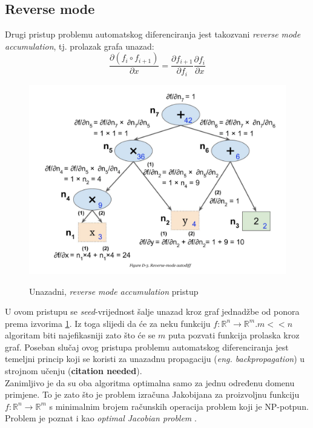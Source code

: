 \documentclass[zavrsnirad]{fer}
\begin{document}
\subsection{Reverse mode}
Drugi pristup problemu automatskog diferenciranja jest takozvani \textit{reverse mode accumulation}, tj. prolazak grafa unazad:
\begin{equation}
  \frac{\partial (f_i \circ f_{i+1})}{\partial x} = \frac{\partial f_{i+1}}{\partial f_i} \frac{\partial f_i}{\partial x}
\end{equation}
\begin{figure}[h]
  \centering
  \includegraphics[width=0.7\linewidth]{"./slike/reverse_graph.png"}
  \caption{Unazadni, \textit{reverse mode accumulation} pristup}
  \cite{srijithr_gitlab}
  \label{slk:reverse_graf}
\end{figure}
U ovom pristupu se \textit{seed}-vrijednost šalje unazad kroz graf jednadžbe od ponora prema izvorima \ref{slk:reverse_graf}. Iz toga slijedi da će za neku funkciju $f\colon \mathbb{R}^n \rightarrow \mathbb{R}^m. m << n$ algoritam biti najefikasniji zato što će se $m$ puta pozvati funkcija prolaska kroz graf. Poseban slučaj ovog pristupa problemu automatskog diferenciranja jest temeljni princip koji se koristi za unazadnu propagaciju (\textit{eng. backpropagation}) u strojnom učenju (\textbf{citation needed}).
\\
Zanimljivo je da su oba algoritma optimalna samo za jednu određenu domenu primjene. To je zato što je problem izračuna Jakobijana za proizvoljnu funkciju $f\colon \mathbb{R}^n \rightarrow \mathbb{R}^m$ s minimalnim brojem računskih operacija problem koji je NP-potpun. Problem je poznat i kao \textit{optimal Jacobian problem} \cite{naumann:optimaljacobian}.
\end{document}
